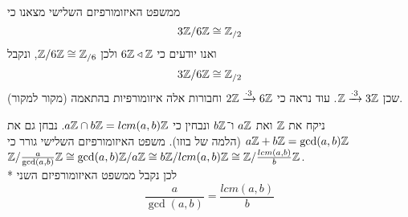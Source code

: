 \begin{remark}[תזכורת]
	ממשפט האיזומורפיזם השלישי מצאנו כי
	\[
		3\mathbb{Z} / 6\mathbb{Z} \cong \mathbb{Z}_{/2}
	\]
	ואנו יודעים כי $6\mathbb{Z} \triangleleft \mathbb{Z}$ ולכן $\mathbb{Z} / 6\mathbb{Z} \cong \mathbb{Z}_{/6}$, ונקבל
	\[
		3\mathbb{Z} / 6\mathbb{Z} \cong \mathbb{Z}_{/2}
	\]
	שכן $\mathbb{Z} \xrightarrow{\cdot 3} 3\mathbb{Z}$. עוד נראה כי $2\mathbb{Z} \xrightarrow{\cdot 3} 6\mathbb{Z}$ וחבורות אלה איזומורפיות בהתאמה (מקור למקור).
\end{remark}
\begin{example}
	ניקח את $\mathbb{Z}$ ואת $a \mathbb{Z}$ ו־$b \mathbb{Z}$ ונבחין כי $a\mathbb{Z} \cap b\mathbb{Z} = lcm(a, b) \mathbb{Z}$.
	נבחן גם את $a\mathbb{Z} + b\mathbb{Z} = \gcd(a, b) \mathbb{Z}$ (הלמה של בוזו).
	משפט האיזומורפיזם השלישי גורר כי $\mathbb{Z} / \frac{a}{\gcd(a, b)}\mathbb{Z} \cong \gcd(a, b) \mathbb{Z} / a\mathbb{Z} \cong b\mathbb{Z} / lcm(a, b) \mathbb{Z} \cong \mathbb{Z} / \frac{lcm(a, b)}{b} \mathbb{Z}$. \\*
	לכן נקבל ממשפט האיזומורפיזם השני
	\[
		\frac{a}{\gcd(a, b)} = \frac{lcm(a, b)}{b}
	\]
\end{example}


